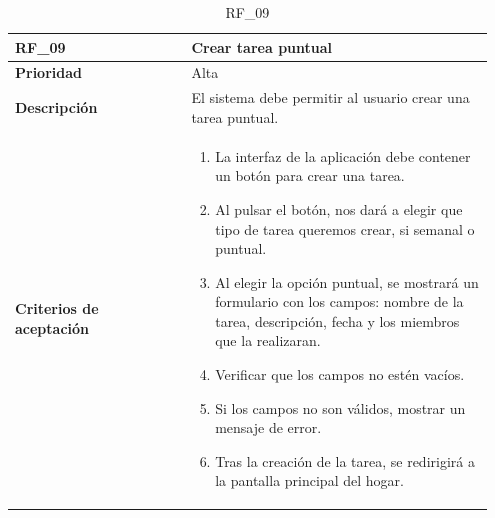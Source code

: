 \begin{table}[htb!]
    \begin{tabular}{|p{0.35\linewidth}|p{0.6\linewidth}|}
        \hline
        \rowcolor[HTML]{C0C0C0}  
        \textbf{RF\_09} & \textbf{Crear tarea puntual} \\
        \hline
        \textbf{Prioridad} & Alta \\
        \hline
        \textbf{Descripción} & El sistema debe permitir al usuario crear una tarea puntual.  \\
        \hline
        \vspace{0.5mm}
        \textbf{Criterios de aceptación} & 
        \begin{minipage}[t]{0.9\linewidth}
            \begin{enumerate}
                \item La interfaz de la aplicación debe contener un botón para crear una tarea.
                \item Al pulsar el botón, nos dará a elegir que tipo de tarea queremos crear, si semanal o puntual.
                \item Al elegir la opción puntual, se mostrará un formulario con los campos: nombre de la tarea, descripción, fecha y los miembros que la realizaran.
                \item Verificar que los campos no estén vacíos.
                \item Si los campos no son válidos, mostrar un mensaje de error.
                \item Tras la creación de la tarea, se redirigirá a la pantalla principal del hogar.
            \end{enumerate}
            \vspace{2mm}
        \end{minipage} \\
        \hline
    \end{tabular}
    \caption{RF\_09}

\end{table}

